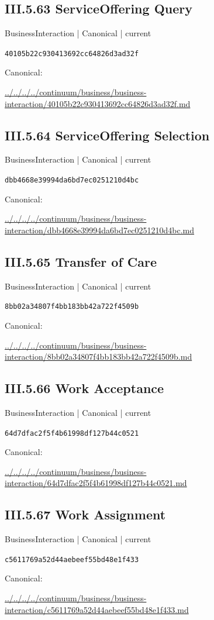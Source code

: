 \documentclass[10pt,a4paper]{article}
\begin{document}
\subsection*{III.5.63 ServiceOffering Query}
{\small BusinessInteraction | Canonical | current}\par
\texttt{40105b22c930413692cc64826d3ad32f}\par
Canonical: \par
{\footnotesize\url{../../../../continuum/business/business-interaction/40105b22c930413692cc64826d3ad32f.md}}\par
\subsection*{III.5.64 ServiceOffering Selection}
{\small BusinessInteraction | Canonical | current}\par
\texttt{dbb4668e39994da6bd7ec0251210d4bc}\par
Canonical: \par
{\footnotesize\url{../../../../continuum/business/business-interaction/dbb4668e39994da6bd7ec0251210d4bc.md}}\par
\subsection*{III.5.65 Transfer of Care}
{\small BusinessInteraction | Canonical | current}\par
\texttt{8bb02a34807f4bb183bb42a722f4509b}\par
Canonical: \par
{\footnotesize\url{../../../../continuum/business/business-interaction/8bb02a34807f4bb183bb42a722f4509b.md}}\par
\subsection*{III.5.66 Work Acceptance}
{\small BusinessInteraction | Canonical | current}\par
\texttt{64d7dfac2f5f4b61998df127b44c0521}\par
Canonical: \par
{\footnotesize\url{../../../../continuum/business/business-interaction/64d7dfac2f5f4b61998df127b44c0521.md}}\par
\subsection*{III.5.67 Work Assignment}
{\small BusinessInteraction | Canonical | current}\par
\texttt{c5611769a52d44aebeef55bd48e1f433}\par
Canonical: \par
{\footnotesize\url{../../../../continuum/business/business-interaction/c5611769a52d44aebeef55bd48e1f433.md}}\par
\end{document}

